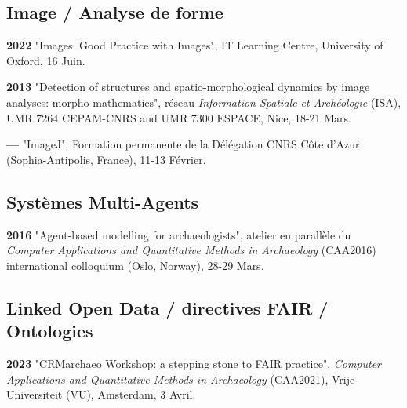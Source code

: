 \documentclass{article}
\newcommand{\fr}[1]{#1}       %
\newcommand{\en}[1]{}     %
\begin{document}
\smallbreak

\subsection*{\fr{Image / Analyse de forme}\en{Image / Shape Analysis}}

\textbf{2022 }
\fr{"Images: Good Practice with Images", IT Learning Centre, University of Oxford, 16 Juin.}
\en{"Images: Good Practice with Images", IT Learning Centre, University of Oxford, June 16.}

\smallbreak
\textbf{2013 }
\fr{"Detection of structures and spatio-morphological dynamics by image analyses: morpho-mathematics", réseau \textit{Information Spatiale et Archéologie} (ISA), UMR 7264 CEPAM-CNRS and UMR 7300 ESPACE, Nice, 18-21 Mars.}
\en{"Detection of Structures and Spatio-Morphological Dynamics by Image Analysis: Morpho-Mathematics", Spatial Information and Archaeology Network (ISA), UMR 7264 CEPAM-CNRS and UMR 7300 ESPACE, Nice, March 18-21.}

\smallbreak
\textbf{--- }
\fr{"ImageJ", Formation permanente de la Délégation CNRS Côte d'Azur (Sophia-Antipolis, France), 11-13 Février.}
\en{"ImageJ", Permanent Training by the CNRS Côte d'Azur Delegation (Sophia-Antipolis, France), February 11-13.}

\smallbreak

\subsection*{\fr{Systèmes Multi-Agents}\en{Multi-Agent Systems}}

\textbf{2016 }
\fr{"Agent-based modelling for archaeologists", atelier en parallèle du \textit{Computer Applications and Quantitative Methods in Archaeology} (CAA2016) international colloquium (Oslo, Norway), 28-29 Mars.}
\en{"Agent-based Modelling for Archaeologists", parallel workshop at the \textit{Computer Applications and Quantitative Methods in Archaeology} (CAA2016) international colloquium (Oslo, Norway), March 28-29.}

\smallbreak

\subsection*{\fr{Linked Open Data / directives FAIR / Ontologies}\en{Linked Open Data / FAIR Guidelines / Ontologies}}

\textbf{2023 }
\fr{"CRMarchaeo Workshop: a stepping stone to FAIR practice", \textit{Computer Applications and Quantitative Methods in Archaeology} (CAA2021), Vrije Universiteit (VU), Amsterdam, 3 Avril.}
\en{"CRMarchaeo Workshop: A Stepping Stone to FAIR Practice", \textit{Computer Applications and Quantitative Methods in Archaeology} (CAA2021), Vrije Universiteit (VU), Amsterdam, April 3.}
\end{document}
